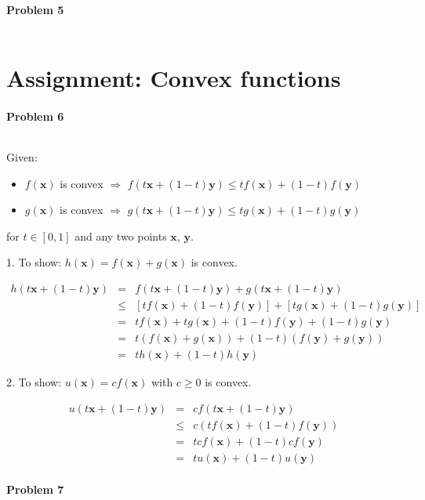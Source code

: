 \documentclass{article}
\renewcommand{\Vec}[1]{\ensuremath{\mathbf{#1}}}
\begin{document}
\paragraph*{Problem 5}
$\;$ 

\section{Assignment: Convex functions}
\paragraph*{Problem 6}
$\;$ 

Given:
\begin{itemize}
\item $f(\Vec{x})$ is convex $\Rightarrow$ $f(t\Vec{x} + (1-t)\Vec{y}) \leq tf(\Vec{x})+(1-t)f(\Vec{y})$
\item $g(\Vec{x})$ is convex $\Rightarrow$ $g(t\Vec{x} + (1-t)\Vec{y}) \leq tg(\Vec{x})+(1-t)g(\Vec{y})$
\end{itemize}
for $t \in [0,1]$ and any two points $\Vec{x}$, $\Vec{y}$.

1. To show: $h(\Vec{x}) = f(\Vec{x}) + g(\Vec{x})$ is convex.

\begin{eqnarray}
h(t\Vec{x} + (1-t)\Vec{y}) &=& f(t\Vec{x} + (1-t)\Vec{y}) + g(t\Vec{x} + (1-t)\Vec{y})\\
&\leq& [tf(\Vec{x})+(1-t)f(\Vec{y})] + [tg(\Vec{x})+(1-t)g(\Vec{y})]\\
&=& tf(\Vec{x}) + tg(\Vec{x}) + (1-t)f(\Vec{y}) + (1-t)g(\Vec{y})\\
&=& t(f(\Vec{x}) + g(\Vec{x})) + (1-t)(f(\Vec{y}) + g(\Vec{y}))\\
&=& th(\Vec{x}) + (1-t)h(\Vec{y})
\end{eqnarray}

2. To show: $u(\Vec{x}) = cf(\Vec{x})$ with $c \geq 0$ is convex.

\begin{eqnarray}
u(t\Vec{x} + (1-t)\Vec{y}) &=& cf(t\Vec{x} + (1-t)\Vec{y})\\
&\leq& c(tf(\Vec{x})+(1-t)f(\Vec{y}))\\
&=& tcf(\Vec{x})+(1-t)cf(\Vec{y})\\
&=& tu(\Vec{x})+(1-t)u(\Vec{y})
\end{eqnarray}


\paragraph*{Problem 7}
$\;$ 
\end{document}
